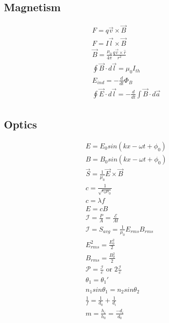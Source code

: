\subsection{Magnetism}
\begin{align}
    F=q\vec{v}\times\vec{B}\\
    F=I\vec{l}\times\vec{B}\\
    \vec{B}=\frac{\mu_0}{4\pi}\frac{q\vec{v}\times\hat{r}}{r^2}\\
    \oint\vec{B}\cdot d\vec{l}=\mu_0I_{th}\\
    E_{ind}=-\frac{d}{dt}\Phi_B\\
    \oint\vec{E}\cdot d\vec{l}=-\frac{d}{dt}\int\vec{B}\cdot d\vec{a}\\
\end{align}

\subsection{Optics}
\begin{align*}
    E=E_0sin(kx-\omega t +\phi_0)\\
    B=B_0sin(kx-\omega t +\phi_0)\\
    \vec{S}=\frac{1}{\mu_0}\vec{E}\times\vec{B}\\
    c=\frac{1}{\sqrt{\epsilon_0\mu_0}}\\
    c=\lambda f\\
    E=cB\\
    \mathscr{I}=\frac{P}{A}=\frac{\mathscr{E}}{At}\\
    \mathscr{I}=S_{avg}=\frac{1}{\mu_0}E_{rms}B_{rms}\\
    E_{rms}^2=\frac{E_0^2}{2}\\
    B_{rms}=\frac{B_0^2}{2}\\
    \mathscr{P}=\frac{\mathscr{I}}{c}\text{ or }2\frac{\mathscr{I}}{c}\\
    \theta_1=\theta_1'\\
    n_1sin\theta_1=n_2sin\theta_2\\
    \frac{1}{f}=\frac{1}{d_0}+\frac{1}{d_i}\\
    m=\frac{h_i}{h_0}=\frac{-d_i}{d_0}\\
\end{align*}
\newpage